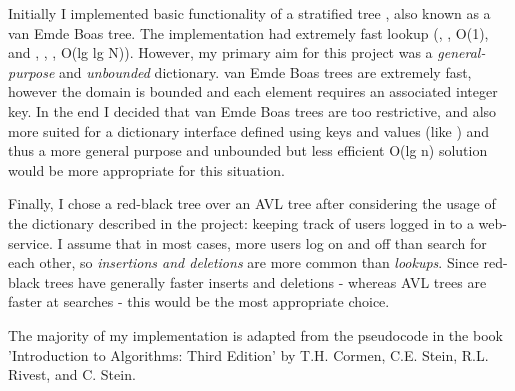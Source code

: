 Initially I implemented basic functionality of a stratified tree \parencite{stratified}, also known as a van Emde Boas tree. The implementation had extremely fast lookup (, ,  O(1), and , , ,  O(lg lg N)). However, my primary aim for this project was a \textit{general-purpose} and \textit{unbounded} dictionary. van Emde Boas trees are extremely fast, however the domain is bounded and each element requires an associated integer key. In the end I decided that van Emde Boas trees are too restrictive, and also more suited for a dictionary interface defined using keys and values (like ) and thus a more general purpose and unbounded but less efficient O(lg n) solution would be more appropriate for this situation.

Finally, I chose a red-black tree over an AVL tree after considering the usage of the dictionary described in the project: keeping track of users logged in to a web-service. I assume that in most cases, more users log on and off than search for each other, so \textit{insertions and deletions} are more common than \textit{lookups}. Since red-black trees have generally faster inserts and deletions \parencite{clrs} - whereas AVL trees are faster at searches - this would be the most appropriate choice.

The majority of my implementation is adapted from the pseudocode in the book 'Introduction to Algorithms: Third Edition' by T.H. Cormen, C.E. Stein, R.L. Rivest, and C. Stein.